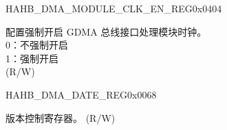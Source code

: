 \addtocounter{Regfloat}{-1}
\begin{register}{H}{AHB\_DMA\_MODULE\_CLK\_EN\_REG}{0x0404}
\begin{regdesc}\begin{reglist}
\item [接上页...]

\label{fielddesc:AHBDMAAHBINFCLKEN}\item [AHB\_DMA\_AHBINF\_CLK\_EN] 配置强制开启 GDMA 总线接口处理模块时钟。\\
0：不强制开启\\
1：强制开启\\ (R/W)
\end{reglist}\end{regdesc}
\end{register}


\begin{register}{H}{AHB\_DMA\_DATE\_REG}{0x0068}\label{regdesc:AHBDMADATEREG}
%
\regnewline%
\begin{regdesc}\begin{reglist}
\label{fielddesc:AHBDMADATE}\item [AHB\_DMA\_DATE] 版本控制寄存器。 (R/W)
\end{reglist}\end{regdesc}
\end{register}


